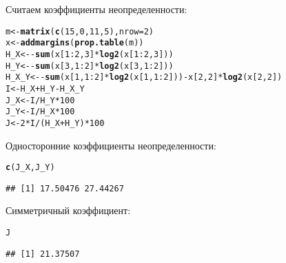 \documentclass{article}\usepackage[]{graphicx}\usepackage[]{color}
\makeatletter
\newcommand{\hlnum}[1]{\textcolor[rgb]{0.686,0.059,0.569}{#1}}%
\newcommand{\hlopt}[1]{\textcolor[rgb]{0,0,0}{#1}}%
\newcommand{\hlstd}[1]{\textcolor[rgb]{0.345,0.345,0.345}{#1}}%
\newcommand{\hlkwb}[1]{\textcolor[rgb]{0.69,0.353,0.396}{#1}}%
\newcommand{\hlkwc}[1]{\textcolor[rgb]{0.333,0.667,0.333}{#1}}%
\newcommand{\hlkwd}[1]{\textcolor[rgb]{0.737,0.353,0.396}{\textbf{#1}}}%
\newenvironment{kframe}{%
 \def\at@end@of@kframe{}%
 \ifinner\ifhmode%
  \def\at@end@of@kframe{\end{minipage}}%
  \begin{minipage}{\columnwidth}%
 \fi\fi%
 \def\FrameCommand##1{\hskip\@totalleftmargin \hskip-\fboxsep
 \colorbox{shadecolor}{##1}\hskip-\fboxsep
     \hskip-\linewidth \hskip-\@totalleftmargin \hskip\columnwidth}%
 \MakeFramed {\advance\hsize-\width
   \@totalleftmargin\z@ \linewidth\hsize
   \@setminipage}}%
 {\par\unskip\endMakeFramed%
 \at@end@of@kframe}
\newenvironment{knitrout}{}{} %
\makeatother
\begin{document}
Считаем коэффициенты неопределенности:
\begin{knitrout}
\color{fgcolor}\begin{kframe}
\begin{alltt}
\hlstd{m} \hlkwb{<-} \hlkwd{matrix}\hlstd{(}\hlkwd{c}\hlstd{(}\hlnum{15}\hlstd{,} \hlnum{0}\hlstd{,} \hlnum{11}\hlstd{,} \hlnum{5}\hlstd{),} \hlkwc{nrow} \hlstd{=} \hlnum{2}\hlstd{)}
\hlstd{x} \hlkwb{<-} \hlkwd{addmargins}\hlstd{(}\hlkwd{prop.table}\hlstd{(m))}
\hlstd{H_X} \hlkwb{<-}  \hlopt{-}\hlkwd{sum}\hlstd{(x[}\hlnum{1}\hlopt{:}\hlnum{2}\hlstd{,} \hlnum{3}\hlstd{]} \hlopt{*} \hlkwd{log2}\hlstd{(x[}\hlnum{1}\hlopt{:}\hlnum{2}\hlstd{,} \hlnum{3}\hlstd{]))}
\hlstd{H_Y} \hlkwb{<-} \hlopt{-}\hlkwd{sum}\hlstd{(x[}\hlnum{3}\hlstd{,} \hlnum{1}\hlopt{:}\hlnum{2}\hlstd{]} \hlopt{*} \hlkwd{log2}\hlstd{(x[}\hlnum{3}\hlstd{,} \hlnum{1}\hlopt{:}\hlnum{2}\hlstd{]))}
\hlstd{H_X_Y} \hlkwb{<-} \hlopt{-}\hlkwd{sum}\hlstd{(x[}\hlnum{1}\hlstd{,} \hlnum{1}\hlopt{:}\hlnum{2}\hlstd{]} \hlopt{*} \hlkwd{log2}\hlstd{(x[}\hlnum{1}\hlstd{,} \hlnum{1}\hlopt{:}\hlnum{2}\hlstd{]))} \hlopt{-} \hlstd{x[}\hlnum{2}\hlstd{,} \hlnum{2}\hlstd{]} \hlopt{*} \hlkwd{log2}\hlstd{(x[}\hlnum{2}\hlstd{,} \hlnum{2}\hlstd{])}
\hlstd{I} \hlkwb{<-} \hlstd{H_X} \hlopt{+} \hlstd{H_Y} \hlopt{-} \hlstd{H_X_Y}
\hlstd{J_X} \hlkwb{<-} \hlstd{I} \hlopt{/} \hlstd{H_Y} \hlopt{*} \hlnum{100}
\hlstd{J_Y} \hlkwb{<-} \hlstd{I} \hlopt{/} \hlstd{H_X} \hlopt{*} \hlnum{100}
\hlstd{J} \hlkwb{<-} \hlnum{2} \hlopt{*} \hlstd{I} \hlopt{/} \hlstd{(H_X} \hlopt{+} \hlstd{H_Y)} \hlopt{*} \hlnum{100}
\end{alltt}
\end{kframe}
\end{knitrout}
Односторонние коэффициенты неопределенности:
\begin{knitrout}
\color{fgcolor}\begin{kframe}
\begin{alltt}
\hlkwd{c}\hlstd{(J_X, J_Y)}
\end{alltt}
\begin{verbatim}
## [1] 17.50476 27.44267
\end{verbatim}
\end{kframe}
\end{knitrout}
Симметричный коэффициент:
\begin{knitrout}
\color{fgcolor}\begin{kframe}
\begin{alltt}
\hlstd{J}
\end{alltt}
\begin{verbatim}
## [1] 21.37507
\end{verbatim}
\end{kframe}
\end{knitrout}
\end{document}
